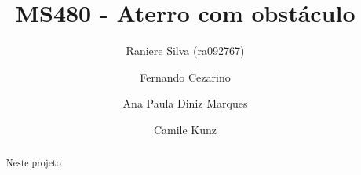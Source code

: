 \documentclass[12pt,a4paper]{article}
\begin{document}
\title{MS480 - Aterro com obst\'{a}culo}
\author{Raniere Silva (ra092767) \and Fernando Cezarino \and Ana Paula Diniz Marques \and Camile Kunz}
\maketitle
\begin{abstract}
    Neste projeto
\end{abstract}





\end{document}
